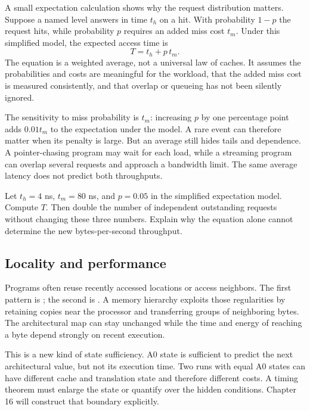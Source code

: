 A small expectation calculation shows why the request distribution matters.
Suppose a named level answers in time \(t_h\) on a hit. With probability
\(1-p\) the request hits, while probability \(p\) requires an added miss cost
\(t_m\). Under this simplified model, the expected access time is
\[
 T=t_h+p\,t_m.
\]
The equation is a weighted average, not a universal law of caches. It assumes
the probabilities and costs are meaningful for the workload, that the added
miss cost is measured consistently, and that overlap or queueing has not been
silently ignored.

The sensitivity to miss probability is \(t_m\): increasing \(p\) by one
percentage point adds \(0.01t_m\) to the expectation under the model. A rare
event can therefore matter when its penalty is large. But an average still
hides tails and dependence. A pointer-chasing program may wait for each load,
while a streaming program can overlap several requests and approach a
bandwidth limit. The same average latency does not predict both throughputs.

\begin{tryit}[title={Name the unit before comparing}]
Let \(t_h=4\) ns, \(t_m=80\) ns, and \(p=0.05\) in the simplified expectation
model. Compute \(T\). Then double the number of independent outstanding
requests without changing these three numbers. Explain why the equation alone
cannot determine the new bytes-per-second throughput.
\end{tryit}

\subsection{Locality and performance}

Programs often reuse recently accessed locations or access neighbors. The
first pattern is ; the second is . A memory hierarchy exploits those regularities by retaining copies
near the processor and transferring groups of neighboring bytes. The
architectural map can stay unchanged while the time and energy of reaching a
byte depend strongly on recent execution.

This is a new kind of state sufficiency. A0 state is sufficient to predict the
next architectural value, but not its execution time. Two runs with equal A0
states can have different cache and translation state and therefore different
costs. A timing theorem must enlarge the state or quantify over the hidden
conditions. Chapter 16 will construct that boundary explicitly.

